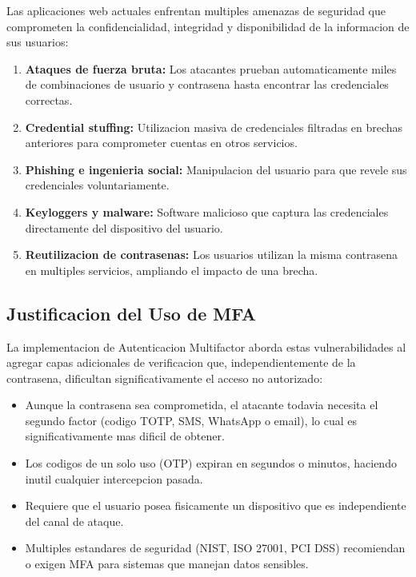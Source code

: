 \documentclass[12pt,a4paper]{article}
\begin{document}
Las aplicaciones web actuales enfrentan multiples amenazas de seguridad que comprometen la confidencialidad, integridad y disponibilidad de la informacion de sus usuarios:

\begin{enumerate}[leftmargin=*, itemsep=3pt]
    \item \textbf{Ataques de fuerza bruta:} Los atacantes prueban automaticamente miles de combinaciones de usuario y contrasena hasta encontrar las credenciales correctas.
    \item \textbf{Credential stuffing:} Utilizacion masiva de credenciales filtradas en brechas anteriores para comprometer cuentas en otros servicios.
    \item \textbf{Phishing e ingenieria social:} Manipulacion del usuario para que revele sus credenciales voluntariamente.
    \item \textbf{Keyloggers y malware:} Software malicioso que captura las credenciales directamente del dispositivo del usuario.
    \item \textbf{Reutilizacion de contrasenas:} Los usuarios utilizan la misma contrasena en multiples servicios, ampliando el impacto de una brecha.
\end{enumerate}

\subsection{Justificacion del Uso de MFA}

La implementacion de Autenticacion Multifactor aborda estas vulnerabilidades al agregar capas adicionales de verificacion que, independientemente de la contrasena, dificultan significativamente el acceso no autorizado:

\begin{itemize}[leftmargin=*, itemsep=3pt]
    \item Aunque la contrasena sea comprometida, el atacante todavia necesita el segundo factor (codigo TOTP, SMS, WhatsApp o email), lo cual es significativamente mas dificil de obtener.
    \item Los codigos de un solo uso (OTP) expiran en segundos o minutos, haciendo inutil cualquier intercepcion pasada.
    \item Requiere que el usuario posea fisicamente un dispositivo que es independiente del canal de ataque.
    \item Multiples estandares de seguridad (NIST, ISO 27001, PCI DSS) recomiendan o exigen MFA para sistemas que manejan datos sensibles.
\end{itemize}
\end{document}

